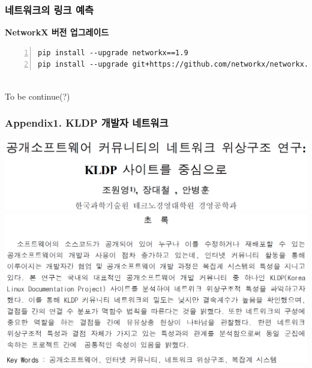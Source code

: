 \documentclass{beamer}
\begin{document}
\begin{frame}[fragile]
\frametitle{네트워크의 링크 예측}
\textbf{NetworkX 버전 업그레이드}
\scriptsize
\begin{block}{}
\begin{Verbatim}[numbers=left,commandchars=\\\{\}]
pip install --upgrade networkx==1.9
pip install --upgrade git+https://github.com/networkx/networkx.git#egg=networkx
\end{Verbatim}
\end{block}
{}\\
\vspace{2cm}
To be continue(?)
\end{frame}

\begin{frame}[fragile]
\frametitle{Appendix1. KLDP 개발자 네트워크}
\begin{center}
\href{http://dspace.kaist.ac.kr/handle/10203/21356}{\includegraphics[scale=0.2]{kldp_1.png}}\\
\includegraphics[scale=0.25]{kldp_2.png}
\end{center}
\end{frame}
\end{document}
